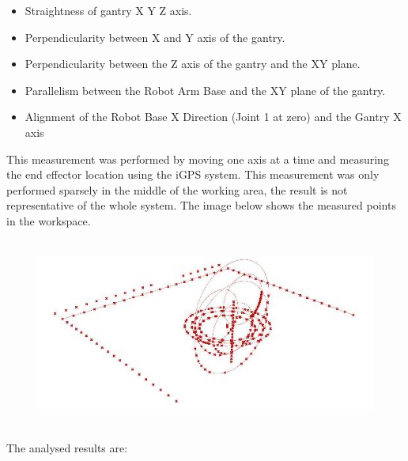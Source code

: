 \documentclass[11pt]{book}
\begin{document}
\begin{itemize}
	\item Straightness of gantry X Y Z axis.

	\item Perpendicularity between X and Y axis of the gantry.

	\item Perpendicularity between the Z axis of the gantry and the XY plane.

	\item Parallelism between the Robot Arm Base and the XY plane of the gantry.

	\item Alignment of the Robot Base X Direction (Joint 1 at zero) and the Gantry X axis

\end{itemize}
This measurement was performed by moving one axis at a time and measuring the end effector location using the iGPS system. This measurement was only performed sparsely in the middle of the working area, the result is not representative of the whole system. The image below shows the measured points in the workspace.

\begin{figure}[H]
\includegraphics[width=13.57cm,height=6.21cm]{./images/image87.jpeg}
\end{figure}


The analysed results are:
\end{document}
